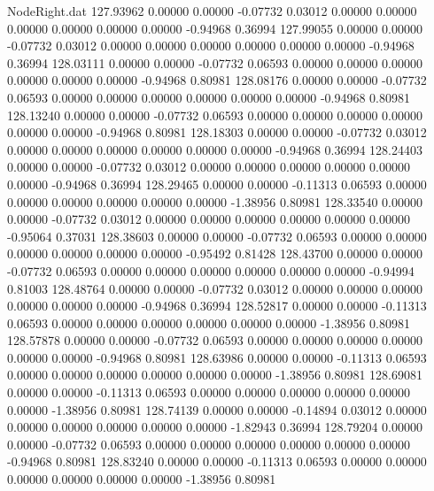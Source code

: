\begin{filecontents}{NodeRight.dat}
 127.93962    0.00000    0.00000    -0.07732    0.03012    0.00000    0.00000    0.00000    0.00000    0.00000    0.00000   -0.94968    0.36994
 127.99055    0.00000    0.00000    -0.07732    0.03012    0.00000    0.00000    0.00000    0.00000    0.00000    0.00000   -0.94968    0.36994
 128.03111    0.00000    0.00000    -0.07732    0.06593    0.00000    0.00000    0.00000    0.00000    0.00000    0.00000   -0.94968    0.80981
 128.08176    0.00000    0.00000    -0.07732    0.06593    0.00000    0.00000    0.00000    0.00000    0.00000    0.00000   -0.94968    0.80981
 128.13240    0.00000    0.00000    -0.07732    0.06593    0.00000    0.00000    0.00000    0.00000    0.00000    0.00000   -0.94968    0.80981
 128.18303    0.00000    0.00000    -0.07732    0.03012    0.00000    0.00000    0.00000    0.00000    0.00000    0.00000   -0.94968    0.36994
 128.24403    0.00000    0.00000    -0.07732    0.03012    0.00000    0.00000    0.00000    0.00000    0.00000    0.00000   -0.94968    0.36994
 128.29465    0.00000    0.00000    -0.11313    0.06593    0.00000    0.00000    0.00000    0.00000    0.00000    0.00000   -1.38956    0.80981
 128.33540    0.00000    0.00000    -0.07732    0.03012    0.00000    0.00000    0.00000    0.00000    0.00000    0.00000   -0.95064    0.37031
 128.38603    0.00000    0.00000    -0.07732    0.06593    0.00000    0.00000    0.00000    0.00000    0.00000    0.00000   -0.95492    0.81428
 128.43700    0.00000    0.00000    -0.07732    0.06593    0.00000    0.00000    0.00000    0.00000    0.00000    0.00000   -0.94994    0.81003
 128.48764    0.00000    0.00000    -0.07732    0.03012    0.00000    0.00000    0.00000    0.00000    0.00000    0.00000   -0.94968    0.36994
 128.52817    0.00000    0.00000    -0.11313    0.06593    0.00000    0.00000    0.00000    0.00000    0.00000    0.00000   -1.38956    0.80981
 128.57878    0.00000    0.00000    -0.07732    0.06593    0.00000    0.00000    0.00000    0.00000    0.00000    0.00000   -0.94968    0.80981
 128.63986    0.00000    0.00000    -0.11313    0.06593    0.00000    0.00000    0.00000    0.00000    0.00000    0.00000   -1.38956    0.80981
 128.69081    0.00000    0.00000    -0.11313    0.06593    0.00000    0.00000    0.00000    0.00000    0.00000    0.00000   -1.38956    0.80981
 128.74139    0.00000    0.00000    -0.14894    0.03012    0.00000    0.00000    0.00000    0.00000    0.00000    0.00000   -1.82943    0.36994
 128.79204    0.00000    0.00000    -0.07732    0.06593    0.00000    0.00000    0.00000    0.00000    0.00000    0.00000   -0.94968    0.80981
 128.83240    0.00000    0.00000    -0.11313    0.06593    0.00000    0.00000    0.00000    0.00000    0.00000    0.00000   -1.38956    0.80981

\end{filecontents}
